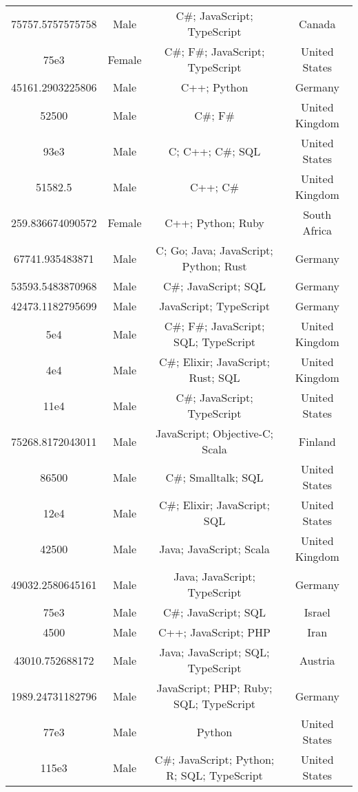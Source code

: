 \begin{center}
\begin{tabular}{ |c|c|c|c| }
75757.5757575758  &  Male  &  C\#; JavaScript; TypeScript  &  Canada  \\ 
75e3  &  Female  &  C\#; F\#; JavaScript; TypeScript  &  United States  \\ 
45161.2903225806  &  Male  &  C++; Python  &  Germany  \\ 
52500  &  Male  &  C\#; F\#  &  United Kingdom  \\ 
93e3  &  Male  &  C; C++; C\#; SQL  &  United States  \\ 
51582.5  &  Male  &  C++; C\#  &  United Kingdom  \\ 
259.836674090572  &  Female  &  C++; Python; Ruby  &  South Africa  \\ 
67741.935483871  &  Male  &  C; Go; Java; JavaScript; Python; Rust  &  Germany  \\ 
53593.5483870968  &  Male  &  C\#; JavaScript; SQL  &  Germany  \\ 
42473.1182795699  &  Male  &  JavaScript; TypeScript  &  Germany  \\ 
5e4  &  Male  &  C\#; F\#; JavaScript; SQL; TypeScript  &  United Kingdom  \\ 
4e4  &  Male  &  C\#; Elixir; JavaScript; Rust; SQL  &  United Kingdom  \\ 
11e4  &  Male  &  C\#; JavaScript; TypeScript  &  United States  \\ 
75268.8172043011  &  Male  &  JavaScript; Objective-C; Scala  &  Finland  \\ 
86500  &  Male  &  C\#; Smalltalk; SQL  &  United States  \\ 
12e4  &  Male  &  C\#; Elixir; JavaScript; SQL  &  United States  \\ 
42500  &  Male  &  Java; JavaScript; Scala  &  United Kingdom  \\ 
49032.2580645161  &  Male  &  Java; JavaScript; TypeScript  &  Germany  \\ 
75e3  &  Male  &  C\#; JavaScript; SQL  &  Israel  \\ 
4500  &  Male  &  C++; JavaScript; PHP  &  Iran  \\ 
43010.752688172  &  Male  &  Java; JavaScript; SQL; TypeScript  &  Austria  \\ 
1989.24731182796  &  Male  &  JavaScript; PHP; Ruby; SQL; TypeScript  &  Germany  \\ 
77e3  &  Male  &  Python  &  United States  \\ 
115e3  &  Male  &  C\#; JavaScript; Python; R; SQL; TypeScript  &  United States  \\ 

\end{tabular}
\end{center}
